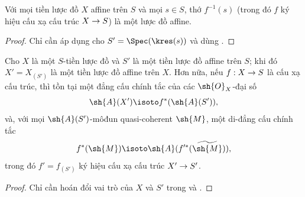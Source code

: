 \documentclass[oneside,10pt]{amsart}
\makeatletter
\newcommand{\ega@arrow}[2]{\mathchoice{#1}{#2}{#2}{#2}}
\renewcommand{\to}{\ega@arrow{\longrightarrow}{\rightarrow}}
\let\EGAOriginalLabel\label
\renewcommand{\label}[1]{\phantomsection\EGAOriginalLabel{#1}}
\makeatother
\begin{document}
\begin{corollary}[1.5.4]
\label{II.1.5.4}
Với mọi tiền lược đồ $X$ affine trên $S$ và mọi $s\in S$, thớ $f^{-1}(s)$ (trong đó $f$ ký hiệu cấu xạ cấu trúc $X\to S$) là một lược đồ affine.
\end{corollary}

\begin{proof}
Chỉ cần áp dụng  cho $S'=\Spec(\kres(s))$ và dùng .
\end{proof}

\begin{corollary}[1.5.5]
\label{II.1.5.5}
Cho $X$ là một $S$-tiền lược đồ và $S'$ là một tiền lược đồ affine trên $S$; khi đó $X'=X_{(S')}$ là một tiền lược đồ affine trên $X$.
Hơn nữa, nếu $f:X\to S$ là cấu xạ cấu trúc, thì tồn tại một đẳng cấu chính tắc của các $\sh{O}_X$-đại số
\[
  \sh{A}(X')\isoto f^*(\sh{A}(S')),
\]
và, với mọi $\sh{A}(S')$-môđun quasi-coherent $\sh{M}$, một di-đẳng cấu chính tắc
\[
  f^*(\sh{M})\isoto\sh{A}(f^{\prime*}(\widetilde{\sh{M}})),
\]
trong đó $f'=f_{(S')}$ ký hiệu cấu xạ cấu trúc $X'\to S'$.
\end{corollary}

\begin{proof}
Chỉ cần hoán đổi vai trò của $X$ và $S'$ trong  và .
\end{proof}
\end{document}
